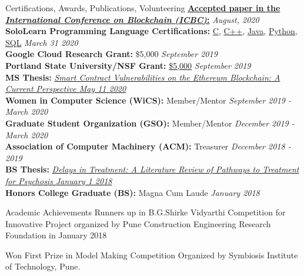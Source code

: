 \documentclass{resume} %
\begin{document}
\begin{rSection}{Certifications, Awards, Publications, Volunteering}
  {\bf{ \href{http://blockchain1000.org/2020/}{Accepted paper in the {\em{International Conference on Blockchain (ICBC)}}:}}} \hfill {\em{August, 2020}}\\
{\bf{SoloLearn Programming Language Certifications:}} 
  \href{https://www.sololearn.com/Certificate/1089-17953779/pdf/?mode=download}{C}, 
  \href{https://www.sololearn.com/Certificate/1051-17953779/pdf/?mode=download}{C++},
  \href{https://www.sololearn.com/Certificate/1068-17953779/pdf/?mode=download}{Java},
  \href{https://www.sololearn.com/Certificate/1073-17953779/pdf/?mode=download}{Python}, 
  \href{https://www.sololearn.com/Certificate/1060-17953779/pdf/?mode=download}{SQL} \hfill {\em{March 31 2020}}\\
{\bf{Google Cloud Research Grant:}} \$5,000 \hfill {\em{September 2019}}\\
  {\bf{Portland State University/NSF Grant:}} \href{https://www.nsf.gov/awardsearch/showAward?AWD\_ID=1821841}{\$5,000} \hfill {\em{September 2019}}\\
  {\bf{MS Thesis:}} \href{https://www.slideshare.net/DanielConnelly15/daniel-connelly-ethereum-smart-contract-masters-thesis}{\itshape{Smart Contract Vulnerabilities on the Ethereum Blockchain: A Current Perspective \hfill {\em{May 11 2020}}}}\\
  {\bf{Women in Computer Science (WiCS):}} Member/Mentor \hfill {\em{September 2019 - March 2020}}\\
  {\bf{Graduate Student Organization (GSO):}} Member/Mentor \hfill {\em{December 2019 - March 2020}}\\
  {\bf{Association of Computer Machinery (ACM):}} Treasurer \hfill {\em{December 2018 - 2019}}\\
  {\bf{BS Thesis:}} \href{https://pdxscholar.library.pdx.edu/honorstheses/496/}{\itshape{Delays in Treatment: A Literature Review of Pathways to Treatment for Psychosis \hfill{\em{January 1 2018}}}}\\
  {\bf{Honors College Graduate (BS):}} Magna Cum Laude \hfill {\em{January 2018}}\\

\end{rSection}






\iffalse
\begin{rSection}{Academic Achievements} 
 Runners up in B.G.Shirke Vidyarthi Competition for Innovative Project organized by Pune Construction Engineering Research Foundation in January 2018
\item Won First Prize in Model Making Competition Organized by Symbiosis Institute of Technology, Pune.
\end{rSection}
\end{document}
